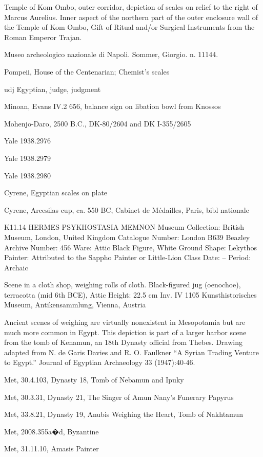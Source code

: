 \documentclass{article}
\begin{document}
Temple of Kom Ombo, outer corridor, depiction of scales on relief to the right of Marcus Aurelius.
Inner aspect of the northern part of the outer enclosure wall of the Temple of Kom Ombo,
Gift of Ritual and/or Surgical Instruments from the Roman Emperor Trajan.

Museo archeologico nazionale di Napoli. Sommer, Giorgio. n. 11144.

Pompeii, House of the Centenarian; Chemist's scales

udj Egyptian, judge, judgment

Minoan, Evans IV.2 656, balance sign on libation bowl from Knossos

Mohenjo-Daro, 2500 B.C., DK-80/2604 and DK I-355/2605

Yale 1938.2976

Yale 1938.2979

Yale 1938.2980

Cyrene, Egyptian scales on plate

Cyrene, Arcesilas cup, ca. 550 BC, Cabinet de M\'edailles, Paris, bibl nationale


K11.14 HERMES PSYKHOSTASIA  MEMNON
Museum Collection: British Museum, London, United Kingdom 
Catalogue Number: London B639 
Beazley Archive Number: 456
Ware: Attic Black Figure, White Ground 
Shape: Lekythos
Painter: Attributed to the Sappho Painter or Little-Lion Class 
Date: --
Period: Archaic

Scene in a cloth shop, weighing rolls of cloth. Black-figured jug (oenochoe), terracotta (mid 6th BCE), Attic Height: 22.5 cm Inv. IV 1105 Kunsthistorisches Museum, Antikensammlung, Vienna, Austria

Ancient scenes of weighing are virtually nonexistent in Mesopotamia but are much more common in Egypt. This depiction is part of a larger harbor scene from the tomb of Kenamun, an 18th Dynasty official from Thebes. Drawing adapted from N. de Garis Davies and R. O. Faulkner ``A Syrian Trading Venture to Egypt.'' Journal of Egyptian Archaeology 33 (1947):40-46.




Met, 30.4.103, Dynasty 18, Tomb of Nebamun and Ipuky

Met, 30.3.31, Dynasty 21, The Singer of Amun Nany's Funerary Papyrus

Met, 33.8.21, Dynasty 19, Anubis Weighing the Heart, Tomb of Nakhtamun

Met, 2008.355a�d, Byzantine

Met, 31.11.10, Amasis Painter
\end{document}
